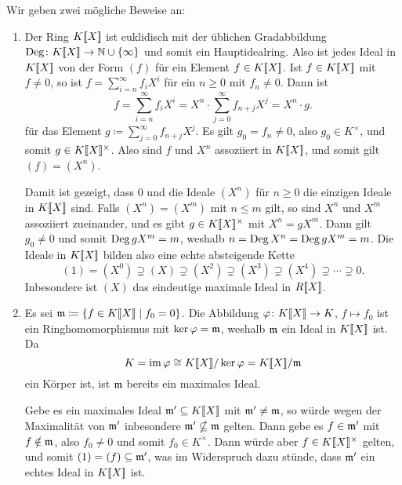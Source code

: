 \begin{solution}
  Wir geben zwei mögliche Beweise an:
  \begin{enumerate}
    \item
      Der Ring $K[\![X]\!]$ ist euklidisch mit der üblichen Gradabbildung $\operatorname{Deg} \colon K[\![X]\!] \to \mathbb{N} \cup \{\infty\}$ und somit ein Hauptidealring.
      Also ist jedes Ideal in $K[\![X]\!]$ von der Form $(f)$ für ein Element $f \in K[\![X]\!]$.
      Ist $f \in K[\![X]\!]$ mit $f \neq 0$, so ist $f = \sum_{i=n}^\infty f_i X^i$ für ein $n \geq 0$ mit $f_n \neq 0$.
      Dann ist
      \[
          f
        = \sum_{i=n}^\infty f_i X^i
        = X^n \cdot \sum_{j=0}^\infty f_{n+j} X^j
        = X^n \cdot g.
      \]
      für das Element $g \coloneqq \sum_{j=0}^\infty f_{n+j} X^j$.
      Es gilt $g_0 = f_n \neq 0$, also $g_0 \in K^\times$, und somit $g \in K[\![X]\!]^\times$.
      Also sind $f$ und $X^n$ assoziiert in $K[\![X]\!]$, und somit gilt $(f) = (X^n)$.
      
      Damit ist gezeigt, dass $0$ und die Ideale $(X^n)$ für $n \geq 0$ die einzigen Ideale in $K[\![X]\!]$ sind.
      Falls $(X^n) = (X^m)$ mit $n \leq m$ gilt, so sind $X^n$ und $X^m$ assoziiert zueinander, und es gibt $g \in K[\![X]\!]^\times$ mit $X^n = g X^m$.
      Dann gilt $g_0 \neq 0$ und somit $\operatorname{Deg} g X^m = m$, weshalb $n = \operatorname{Deg} X^n = \operatorname{Deg} g X^m = m$.
      Die Ideale in $K[\![X]\!]$ bilden also eine echte absteigende Kette
      \[
                    (1)
        =           (X^0)
        \supsetneq  (X)
        \supsetneq  (X^2)
        \supsetneq  (X^3)
        \supsetneq  (X^4)
        \supsetneq \dotsb
        \supsetneq  0.
      \]
      Inbesondere ist $(X)$ das eindeutige maximale Ideal in $R[\![X]\!]$.
    \item
      Es sei $\mathfrak{m} \coloneqq \{f \in K[\![X]\!] \mid f_0 = 0\}$.
      Die Abbildung $\varphi \colon K[\![X]\!] \to K$, $f \mapsto f_0$ ist ein Ringhomomorphismus mit $\ker \varphi = \mathfrak{m}$, weshalb $\mathfrak{m}$ ein Ideal in $K[\![X]\!]$ ist.
      Da
      \[
              K
        =     \operatorname{im} \varphi
        \cong K[\![X]\!]/\ker \varphi
        =     K[\![X]\!]/\mathfrak{m}
      \]
      ein Körper ist, ist $\mathfrak{m}$ bereits ein maximales Ideal.

      Gebe es ein maximales Ideal $\mathfrak{m}' \subseteq K[\![X]\!]$ mit $\mathfrak{m}' \neq \mathfrak{m}$, so würde wegen der Maximalität von $\mathfrak{m}'$ inbesondere $\mathfrak{m}' \nsubseteq \mathfrak{m}$ gelten.
      Dann gebe es $f \in \mathfrak{m}'$ mit $f \notin \mathfrak{m}$, also $f_0 \neq 0$ und somit $f_0 \in K^\times$.
      Dann würde aber $f \in K[\![X]\!]^\times$ gelten, und somit $(1) = (f) \subseteq \mathfrak{m}'$, was im Widerspruch dazu stünde, dass $\mathfrak{m}'$ ein echtes Ideal in $K[\![X]\!]$ ist.
  \end{enumerate}
\end{solution}
